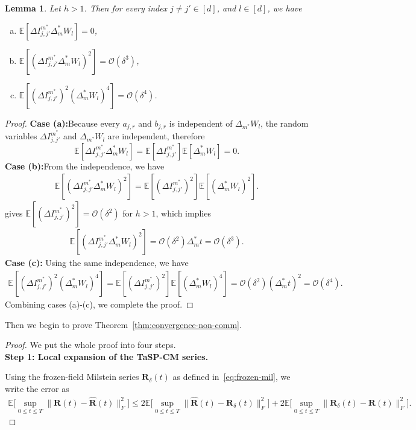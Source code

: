 \documentclass[11pt, a4paper, onecolumn]{article}
\newcommand{\E}{\mathbb{E}}
\newcommand{\bfR}{\mathbf{R}}
\newcommand{\hatR}{\widehat{\bfR}}
\newcommand{\calO}{\mathcal{O}}
\newcommand{\ms}{{m^*}}
\newcommand{\Dms}{{\Delta^{*}_{m}}}
\newcommand{\DIjjpms}{\Delta{I_{j,j'}^{\ms}}}
\newtheorem{lemma}{Lemma}
\begin{document}
\begin{appendices}
\begin{lemma}\label{lem:DI1W-DI2W2-DI2W4}Let $h>1$. Then for every index $j\neq j' \in [d]$, and $l\in [d]$, we have
\begin{enumerate}[(a)]
    \item $ \E[\DIjjpms\Dms W_l] = 0$,
    \item $ \E[(\DIjjpms\Dms W_l)^2] = \calO(\delta^3)$,
    \item $ \E[(\DIjjpms)^2(\Dms W_l)^4] = \calO(\delta^4)$.
\end{enumerate}
\end{lemma}
\begin{proof}
\textbf{Case (a):}Because every $a_{j,r}$ and $b_{j,r}$ is independent of $\Delta_\ms W_l$, the random variables $\DIjjpms$ and $\Delta_\ms W_l$ are independent, therefore
$$\E[\DIjjpms\Dms W_l]  = \E[\DIjjpms]\E[\Dms W_l]=0. $$
\textbf{Case (b):}From the independence, we have
    \begin{align*}
        \E[(\DIjjpms\Dms W_l)^2] = \E[(\DIjjpms)^2]\E[(\Dms W_l)^2].
    \end{align*}
     gives  $\E[(\DIjjpms)^2] = \calO(\delta^2)$ for $h>1$, which implies
    \begin{align*}
        \E[(\DIjjpms\Dms W_l)^2] = \calO(\delta^2)\Dms t= \calO(\delta^3).
    \end{align*}
\textbf{Case (c):}  Using the same independence, we have
    \begin{align*}
        \E[(\DIjjpms)^2(\Dms W_l)^4] = \E[(\DIjjpms)^2]\E[(\Dms W_l)^4] = \calO(\delta^2)(\Dms t)^2 = \calO(\delta^4).
    \end{align*}
Combining cases (a)-(c), we complete the proof.
\end{proof}

Then we begin to prove Theorem~\ref{thm:convergence-non-comm}.
\begin{proof}
We put the whole proof into four steps.\\

\noindent\textbf{Step 1: Local expansion of the TaSP-CM series.}  


Using the frozen-field Milstein series $\bfR_\delta(t)$ as defined in~\cref{eq:frozen-mil}, we write the error as
\begin{align*}
      \E\big[ \sup_{0 \le t\le T} \| \bfR(t) - \hatR(t) \|^2_F \big] \le 2\E\big[ \sup_{0 \le t\le T}\| \hatR(t)- \bfR_\delta(t) \|_F^2 \big] + 2\E\big[ \sup_{0 \le t\le T} \|  \bfR_\delta(t) - \bfR(t)\|^2_F \big].
\end{align*}


\end{proof}
\end{appendices}
\end{document}
